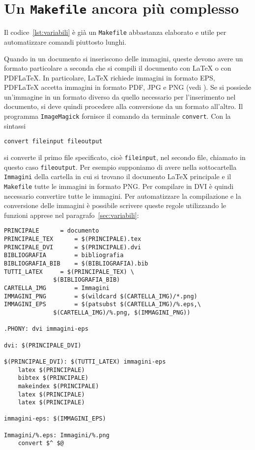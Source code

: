\section{Un \texttt{Makefile} ancora più complesso}
Il codice~\ref{lst:variabili} è già un \verb|Makefile| abbastanza elaborato e
utile per automatizzare comandi piuttosto lunghi.

Quando in un documento si inseriscono delle immagini, queste devono avere un
formato particolare a seconda che si compili il documento con \LaTeX{}
o con \textsc{PDF}\LaTeX.  In particolare, \LaTeX{}
richiede immagini in formato \textsc{EPS}, \textsc{PDF}\LaTeX{}
accetta immagini in formato \textsc{PDF}, \textsc{JPG} e \textsc{PNG} (vedi
\textcite[105]{pantieri:latex}).  Se si possiede un'immagine in un formato
diverso da quello necessario per l'inserimento nel documento, si deve quindi
procedere alla conversione da un formato all'altro.  Il programma
\verb|ImageMagick| fornisce il comando da terminale \verb|convert|. Con la
sintassi
\begin{verbatim}
convert fileinput fileoutput
\end{verbatim}
si converte il primo file specificato, cioè \verb|fileinput|, nel secondo file,
chiamato in questo caso \verb|fileoutput|.  Per esempio supponiamo di avere
nella sottocartella \verb|Immagini| della cartella in cui si trovano il
documento \LaTeX{}
principale e il \verb|Makefile| tutte le immagini in formato \textsc{PNG}.  Per
compilare in \textsc{DVI} è quindi necessario convertire tutte le immagini.  Per
automatizzare la compilazione e la conversione delle immagini è possibile
scrivere queste regole utilizzando le funzioni apprese nel
paragrafo~\ref{sec:variabili}:
\begin{lstlisting}[caption={\texttt{Makefile} in cui le immagini \textsc{PNG}
vengono convertite in \textsc{EPS} nella compilazione con \LaTeX},label=lst:png-eps]
PRINCIPALE 		= documento
PRINCIPALE_TEX		= $(PRINCIPALE).tex
PRINCIPALE_DVI		= $(PRINCIPALE).dvi
BIBLIOGRAFIA		= bibliografia
BIBLIOGRAFIA_BIB	= $(BIBLIOGRAFIA).bib
TUTTI_LATEX		= $(PRINCIPALE_TEX) \
			  $(BIBLIOGRAFIA_BIB)
CARTELLA_IMG		= Immagini
IMMAGINI_PNG		= $(wildcard $(CARTELLA_IMG)/*.png)
IMMAGINI_EPS		= $(patsubst $(CARTELLA_IMG)/%.eps,\
			  $(CARTELLA_IMG)/%.png, $(IMMAGINI_PNG))

.PHONY: dvi immagini-eps

dvi: $(PRINCIPALE_DVI)

$(PRINCIPALE_DVI): $(TUTTI_LATEX) immagini-eps
	latex $(PRINCIPALE)
	bibtex $(PRINCIPALE)
	makeindex $(PRINCIPALE)
	latex $(PRINCIPALE)
	latex $(PRINCIPALE)

immagini-eps: $(IMMAGINI_EPS)

Immagini/%.eps: Immagini/%.png
	convert $^ $@
\end{lstlisting}
